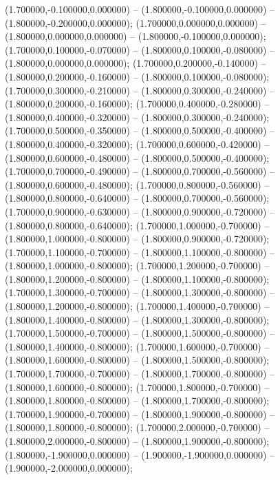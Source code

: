  (1.700000,-0.100000,0.000000) -- (1.800000,-0.100000,0.000000) -- (1.800000,-0.200000,0.000000);
 (1.700000,0.000000,0.000000) -- (1.800000,0.000000,0.000000) -- (1.800000,-0.100000,0.000000);
 (1.700000,0.100000,-0.070000) -- (1.800000,0.100000,-0.080000) -- (1.800000,0.000000,0.000000);
 (1.700000,0.200000,-0.140000) -- (1.800000,0.200000,-0.160000) -- (1.800000,0.100000,-0.080000);
 (1.700000,0.300000,-0.210000) -- (1.800000,0.300000,-0.240000) -- (1.800000,0.200000,-0.160000);
 (1.700000,0.400000,-0.280000) -- (1.800000,0.400000,-0.320000) -- (1.800000,0.300000,-0.240000);
 (1.700000,0.500000,-0.350000) -- (1.800000,0.500000,-0.400000) -- (1.800000,0.400000,-0.320000);
 (1.700000,0.600000,-0.420000) -- (1.800000,0.600000,-0.480000) -- (1.800000,0.500000,-0.400000);
 (1.700000,0.700000,-0.490000) -- (1.800000,0.700000,-0.560000) -- (1.800000,0.600000,-0.480000);
 (1.700000,0.800000,-0.560000) -- (1.800000,0.800000,-0.640000) -- (1.800000,0.700000,-0.560000);
 (1.700000,0.900000,-0.630000) -- (1.800000,0.900000,-0.720000) -- (1.800000,0.800000,-0.640000);
 (1.700000,1.000000,-0.700000) -- (1.800000,1.000000,-0.800000) -- (1.800000,0.900000,-0.720000);
 (1.700000,1.100000,-0.700000) -- (1.800000,1.100000,-0.800000) -- (1.800000,1.000000,-0.800000);
 (1.700000,1.200000,-0.700000) -- (1.800000,1.200000,-0.800000) -- (1.800000,1.100000,-0.800000);
 (1.700000,1.300000,-0.700000) -- (1.800000,1.300000,-0.800000) -- (1.800000,1.200000,-0.800000);
 (1.700000,1.400000,-0.700000) -- (1.800000,1.400000,-0.800000) -- (1.800000,1.300000,-0.800000);
 (1.700000,1.500000,-0.700000) -- (1.800000,1.500000,-0.800000) -- (1.800000,1.400000,-0.800000);
 (1.700000,1.600000,-0.700000) -- (1.800000,1.600000,-0.800000) -- (1.800000,1.500000,-0.800000);
 (1.700000,1.700000,-0.700000) -- (1.800000,1.700000,-0.800000) -- (1.800000,1.600000,-0.800000);
 (1.700000,1.800000,-0.700000) -- (1.800000,1.800000,-0.800000) -- (1.800000,1.700000,-0.800000);
 (1.700000,1.900000,-0.700000) -- (1.800000,1.900000,-0.800000) -- (1.800000,1.800000,-0.800000);
 (1.700000,2.000000,-0.700000) -- (1.800000,2.000000,-0.800000) -- (1.800000,1.900000,-0.800000);
 (1.800000,-1.900000,0.000000) -- (1.900000,-1.900000,0.000000) -- (1.900000,-2.000000,0.000000);
